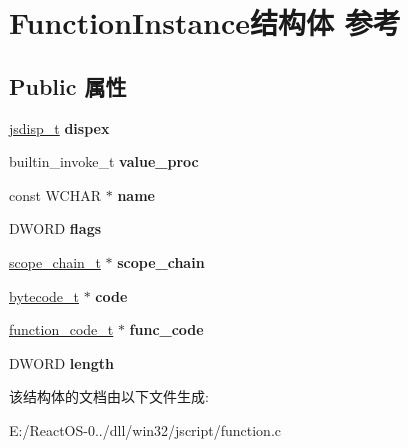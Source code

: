 \hypertarget{struct_function_instance}{}\section{Function\+Instance结构体 参考}
\label{struct_function_instance}
\subsection*{Public 属性}
\begin{DoxyCompactItemize}
\item 
\mbox{\label{struct_function_instance_abfa897946522f69f4941b2113caa7131}} 
\hyperlink{structjsdisp__t}{jsdisp\+\_\+t} {\bfseries dispex}
\item 
\mbox{\label{struct_function_instance_ad08f3e0030c93cca7718ba562103e2d9}} 
builtin\+\_\+invoke\+\_\+t {\bfseries value\+\_\+proc}
\item 
\mbox{\label{struct_function_instance_ab8acc42c7bfc4901292f2dd0b963fec1}} 
const W\+C\+H\+AR $\ast$ {\bfseries name}
\item 
\mbox{\label{struct_function_instance_ace13ffde83b0b778e5ffdf1943de682e}} 
D\+W\+O\+RD {\bfseries flags}
\item 
\mbox{\label{struct_function_instance_a75974edc659b2cc5db2fcb349d9549a7}} 
\hyperlink{struct__scope__chain__t}{scope\+\_\+chain\+\_\+t} $\ast$ {\bfseries scope\+\_\+chain}
\item 
\mbox{\label{struct_function_instance_a93a3e79f8ff2fb46623431bc63b22975}} 
\hyperlink{struct__bytecode__t}{bytecode\+\_\+t} $\ast$ {\bfseries code}
\item 
\mbox{\label{struct_function_instance_aec11f8422d1f3cd0030351415d755fcf}} 
\hyperlink{struct__function__code__t}{function\+\_\+code\+\_\+t} $\ast$ {\bfseries func\+\_\+code}
\item 
\mbox{\label{struct_function_instance_a78ca380ca2a69217cd1f9936f6fea101}} 
D\+W\+O\+RD {\bfseries length}
\end{DoxyCompactItemize}


该结构体的文档由以下文件生成\+:\begin{DoxyCompactItemize}
\item 
E\+:/\+React\+O\+S-\/0../dll/win32/jscript/function.\+c\end{DoxyCompactItemize}
